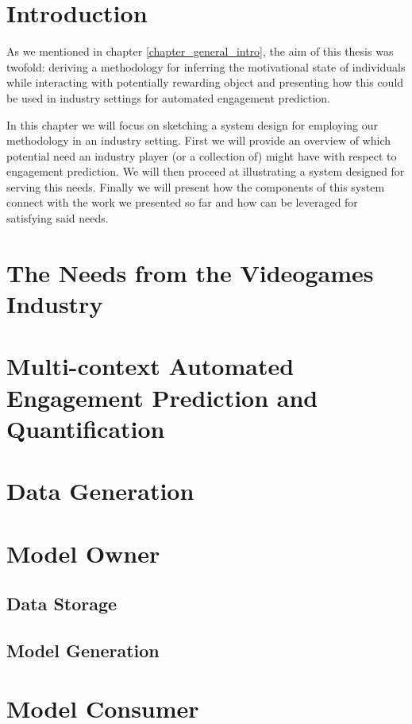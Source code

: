 \section{Introduction}
\label{industry_needs}
As we mentioned in chapter \ref{chapter_general_intro}, the aim of this thesis was twofold: deriving a methodology for inferring the motivational state of individuals while interacting with potentially rewarding object and presenting how this could be used in industry settings for automated engagement prediction.

In this chapter we will focus on sketching a system design for employing our methodology in an industry setting. First we will provide an overview of which potential need an industry player (or a collection of) might have with respect to engagement prediction. We will then proceed at illustrating a system designed for serving this needs. Finally we will present how the components of this system connect with the work we presented so far and how can be leveraged for satisfying said needs.

\section{The Needs from the Videogames Industry}
\label{industry_needs}
\lorem

\section{Multi-context Automated Engagement Prediction and Quantification}
\label{industry_needs}

\section{Data Generation}
\lorem
\section{Model Owner}
\lorem
\subsection{Data Storage}
\lorem
\subsection{Model Generation}
\lorem
\section{Model Consumer}
\lorem
